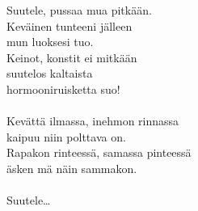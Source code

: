 
        Suutele, pussaa mua pitkään. \\
        Keväinen tunteeni jälleen \\
        mun luoksesi tuo. \\
        Keinot, konstit ei mitkään \\
        suutelos kaltaista \\
        hormooniruisketta suo! \\
\hspace{10mm} \\
        Kevättä ilmassa, inehmon rinnassa \\
        kaipuu niin polttava on. \\
        Rapakon rinteessä, samassa pinteessä \\
        äsken mä näin sammakon. \\
\hspace{10mm} \\
        Suutele… \\
